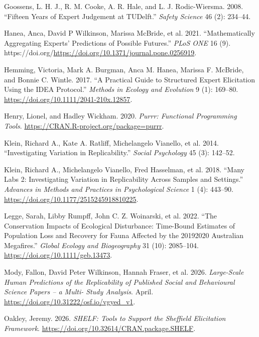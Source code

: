 \documentclass[
  11pt,
  a4paper,
]{article}
\newlength{\cslhangindent}
\newenvironment{CSLReferences}[2] %
 {\begin{list}{}{%
  \setlength{\itemindent}{0pt}
  \setlength{\leftmargin}{0pt}
  \setlength{\parsep}{0pt}
  \ifodd #1
   \setlength{\leftmargin}{\cslhangindent}
   \setlength{\itemindent}{-1\cslhangindent}
  \fi
  \setlength{\itemsep}{#2\baselineskip}}}
 {\end{list}}
\begin{document}
\begin{CSLReferences}{1}{1}
Goossens, L. H. J., R. M. Cooke, A. R. Hale, and L. J. Rodic-Wiersma.
2008. {``Fifteen Years of Expert Judgement at TUDelft.''} \emph{Safety
Science} 46 (2): 234--44.

{Hanea, Anca, David P Wilkinson, Marissa McBride, et al.} 2021.
{``Mathematically Aggregating Experts' Predictions of Possible
Futures.''} \emph{PLoS ONE} 16 (9).
https://doi.org/\url{https://doi.org/10.1371/journal.pone.0256919}.

Hemming, Victoria, Mark A. Burgman, Anca M. Hanea, Marissa F. McBride,
and Bonnie C. Wintle. 2017. {``A Practical Guide to Structured Expert
Elicitation Using the IDEA Protocol.''} \emph{Methods in Ecology and
Evolution} 9 (1): 169--80.
\url{https://doi.org/10.1111/2041-210x.12857}.

Henry, Lionel, and Hadley Wickham. 2020. \emph{Purrr: Functional
Programming Tools}. \url{https://CRAN.R-project.org/package=purrr}.

{Klein, Richard A., Kate A. Ratliff, Michelangelo Vianello, et al.}
2014. {``Investigating Variation in Replicability.''} \emph{Social
Psychology} 45 (3): 142--52.

Klein, Richard A., Michelangelo Vianello, Fred Hasselman, et al. 2018.
{``Many Labs 2: Investigating Variation in Replicability Across Samples
and Settings.''} \emph{Advances in Methods and Practices in
Psychological Science} 1 (4): 443--90.
\url{https://doi.org/10.1177/2515245918810225}.

Legge, Sarah, Libby Rumpff, John C. Z. Woinarski, et al. 2022. {``The
Conservation Impacts of Ecological Disturbance: Time-Bound Estimates of
Population Loss and Recovery for Fauna Affected by the
2019{\textendash}2020 Australian Megafires.''} \emph{Global Ecology and
Biogeography} 31 (10): 2085--104.
\url{https://doi.org/10.1111/geb.13473}.

Mody, Fallon, David Peter Wilkinson, Hannah Fraser, et al. 2026.
\emph{Large-Scale Human Predictions of the Replicability of Published
Social and Behavioural Science Papers -- a Multi- Study Analysis}.
April. \url{https://doi.org/10.31222/osf.io/vgyed_v1}.

Oakley, Jeremy. 2026. \emph{SHELF: Tools to Support the Sheffield
Elicitation Framework}.
\url{https://doi.org/10.32614/CRAN.package.SHELF}.


\end{CSLReferences}
\end{document}
